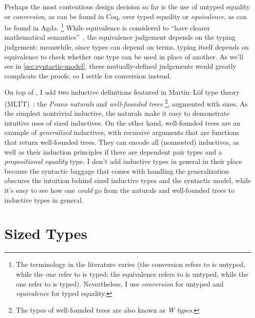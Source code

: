 Perhaps the most contentious design decision so far is the use of untyped equality
or \emph{conversion}, as can be found in Coq,
over typed equality or \emph{equivalence},
as can be found in Agda.%
\footnote{The terminology in the literature varies
(the conversion \citet{MetaCoq} refers to is untyped, while the one \citet{conversion} refer to is typed;
the equivalence \citet{wjb} refers to is untyped, while the one \citet{equivalence} refer to is typed).
Nevertheless, I use \emph{conversion} for untyped and \emph{equivalence} for typed equality.}
While equivalence is considered to ``have clearer mathematical semantics''~\citep{typed-NbE},
the equivalence judgement depends on the typing judgement;
meanwhile, since types can depend on terms,
typing itself depends on equivalence to check whether one type can be used in place of another.
As we'll see in \cref{sec:syntactic-model}, these mutually-defined judgements would greatly complicate the proofs,
so I settle for conversion instead.

On top of \GCC, I add two inductive definitions featured in Martin--L\"of type theory (MLTT)~\citep{mltt}:
the \emph{Peano naturals} and \emph{well-founded trees}%
\footnote{The types of well-founded trees are also known as \emph{W types}.},
augmented with sizes.
As the simplest nontrivial inductive,
the naturals make it easy to demonstrate intuitive uses of sized inductives.
On the other hand, well-founded trees are an example of \emph{generalized} inductives,
with recursive arguments that are functions that return well-founded trees.
They can encode all (nonnested) inductives,
as well as their induction principles \citep{whynotW} if there are dependent pair types
and a \emph{propositional equality} type.
I don't add inductive types in general in their place
because the syntactic baggage that comes with handling the generalization
obscures the intuition behind sized inductive types and the syntactic model,
while it's easy to see how one \emph{could} go from the naturals and well-founded trees
to inductive types in general.

\iffalse
Finally, I add a standard \emph{homogeneous propositional equality type}\index{propositional equality},
which isn't particularly difficult to deal with
and will allow for some more interesting examples.
\fi

\section{Sized Types}\label{sec:sized-types}

